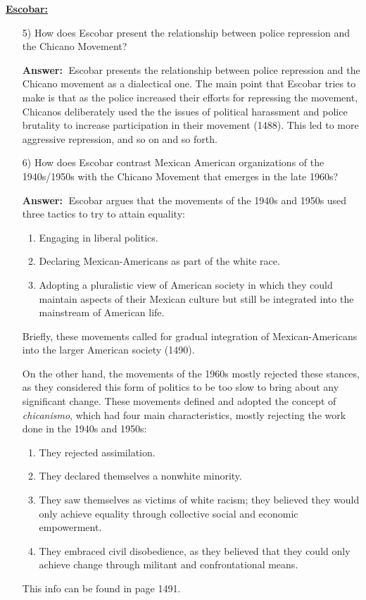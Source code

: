 \documentclass{article}
\newcommand{\answer}{\textbf{Answer:}$\;$}
\begin{document}
\underline{\textbf{Escobar:}}
\begin{enumerate}

    
    \item[5)] How does Escobar present the relationship between police repression and the Chicano Movement? 
    
    \answer
    Escobar presents the relationship between police repression and the Chicano movement as a dialectical one.
    The main point that Escobar tries to make is that as the police increased their efforts for repressing the movement, Chicanos deliberately used the the issues of political harassment and police brutality to increase participation in their movement (1488).
    This led to more aggressive repression, and so on and so forth.

    \item[6)] How does Escobar contrast Mexican American organizations of the 1940s/1950s with the Chicano Movement that emerges in the late 1960s?
    
    \answer
    Escobar argues that the movements of the 1940s and 1950s used three tactics to try to attain equality:
    \begin{enumerate}
        \item Engaging in liberal politics.
        \item Declaring Mexican-Americans as part of the white race.
        \item Adopting a pluralistic view of American society in which they could maintain aspects of their Mexican culture but still be integrated into the mainstream of American life.
    \end{enumerate}
    Briefly, these movements called for gradual integration of Mexican-Americans into the larger American society (1490).

    On the other hand, the movements of the 1960s mostly rejected these stances, as they considered this form of politics to be too slow to bring about any significant change.
    These movements defined and adopted the concept of \textit{chicanismo}, which had four main characteristics, mostly rejecting the work done in the 1940s and 1950s:
    \begin{enumerate}
        \item They rejected assimilation.
        \item They declared themselves a nonwhite minority.
        \item They saw themselves as victims of white racism; they believed they would only achieve equality through collective social and economic empowerment.
        \item They embraced civil disobedience, as they believed that they could only achieve change through militant and confrontational means.
    \end{enumerate}
    This info can be found in page 1491.
    

\end{enumerate}
\end{document}

